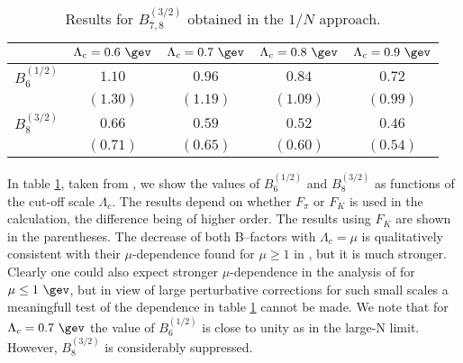 \begin{table}[thb]
\caption[]{ Results for $B^{(3/2)}_{7,8}$ obtained
in the $1/N$ approach. 
\label{tab:318}}
\begin{center}
\begin{tabular}{|c||c|c|c|c|}\hline
  & $\Lambda_c=0.6~\gev$ & $\Lambda_c=0.7~\gev$ & 
$\Lambda_c=0.8~\gev$ & $\Lambda_c=0.9~\gev$ \\
 \hline\hline
$B_{6}^{(1/2)}$ & $1.10$ &$0.96$ & $0.84$ & $ 0.72 $ \\
                & $(1.30)$ &$(1.19)$ & $(1.09)$ & $(0.99) $ \\
$B_{8}^{(3/2)}$ & $0.66$ &$0.59$ & $0.52$ & $ 0.46 $ \\
                & $(0.71)$ &$(0.65)$ & $(0.60)$ & $(0.54) $ \\
\hline
\end{tabular}
\end{center}
\end{table}
In table \ref{tab:318}, taken from \cite{DORT98}, we show the values of
$B_{6}^{(1/2)}$ and $B_{8}^{(3/2)}$ as functions of the cut-off
scale $\Lambda_c$. The results depend on whether $F_\pi$ or
$F_K$ is used in the calculation, the difference being of higher
order. The results using $F_K$ are shown in the parentheses.
The decrease of both B--factors with $\Lambda_c=\mu$ is qualitatively
consistent with their $\mu$-dependence found for $\mu\ge 1$ in
\cite{BJLW}, but it is much stronger. Clearly one could also
expect stronger $\mu$-dependence in the analysis of \cite{BJLW}
for $\mu\le 1~\gev$, but in view of large perturbative corrections
for such small scales a meaningfull test of the dependence in
table \ref{tab:318} cannot be made.
We note that for $\Lambda_c=0.7~\gev$  the value of $B_{6}^{(1/2)}$
is close to unity as in the large-N limit. However, $B_{8}^{(3/2)}$
is considerably suppressed.


